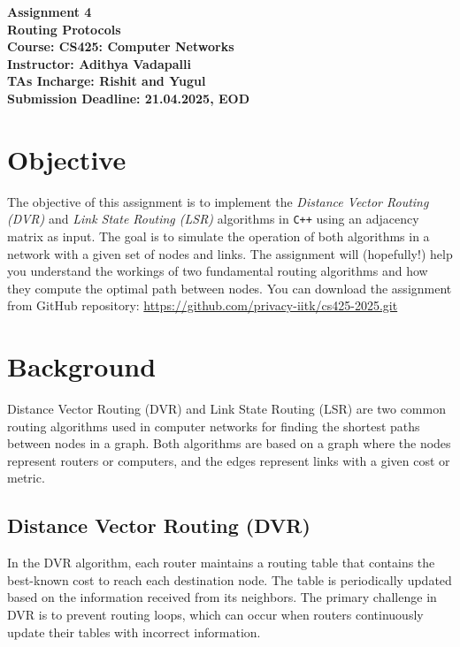 \documentclass[12pt,a4paper]{article}
\begin{document}
\begin{titlepage}
    \centering
    \vspace{2cm}
    \vspace{1cm}

    {\Huge \textbf{Assignment 4}}\\[1cm]
    {\Large \textbf{Routing Protocols}}\\[2cm]

    \textbf{Course: CS425: Computer Networks}\\[0.5cm]
    \textbf{Instructor:  Adithya Vadapalli }\\[0.5cm]
    \textbf{TAs Incharge: Rishit and Yugul}\\[3cm]

    \vfill
    \textbf{Submission Deadline: 21.04.2025, EOD}\\[0.5cm]
    \vfill

\end{titlepage}

\section*{Objective}
The objective of this assignment is to implement the \emph{Distance Vector Routing (DVR)} and \emph{Link State Routing (LSR)} algorithms in \texttt{C++} using an adjacency matrix as input. The goal is to simulate the operation of both algorithms in a network with a given set of nodes and links. The assignment will (hopefully!) help you understand the workings of two fundamental routing algorithms and how they compute the optimal path between nodes.
You can download the assignment from GitHub repository: \url{https://github.com/privacy-iitk/cs425-2025.git} 



\section*{Background}
Distance Vector Routing (DVR) and Link State Routing (LSR) are two common routing algorithms used in computer networks for finding the shortest paths between nodes in a graph. Both algorithms are based on a graph where the nodes represent routers or computers, and the edges represent links with a given cost or metric.
 
\subsection*{Distance Vector Routing (DVR)}
In the DVR algorithm, each router maintains a routing table that contains the best-known cost to reach each destination node. The table is periodically updated based on the information received from its neighbors. The primary challenge in DVR is to prevent routing loops, which can occur when routers continuously update their tables with incorrect information.
\end{document}
